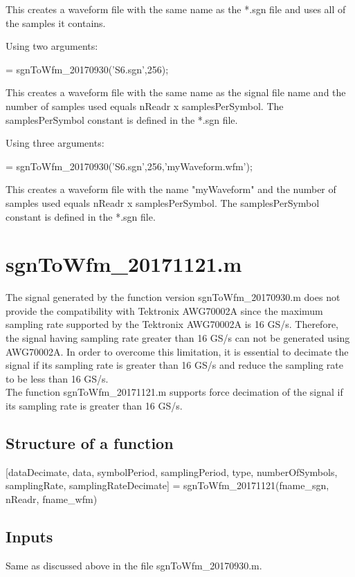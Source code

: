 \noindent
This creates a waveform file with the same name as the *.sgn file and uses all of the samples it contains.
\bigskip

\noindent
Using two arguments:

\bigskip

 = sgnToWfm\_20170930('S6.sgn',256);
\bigskip

\noindent
This creates a waveform file with the same name as the signal file name and the number of samples used equals nReadr x samplesPerSymbol. The samplesPerSymbol constant is 	defined in the *.sgn file.
\bigskip

\noindent
Using three arguments:

\bigskip

 = sgnToWfm\_20170930('S6.sgn',256,'myWaveform.wfm');
\bigskip

\noindent
This creates a waveform file with the name "myWaveform" and the number of samples used equals nReadr x samplesPerSymbol. The samplesPerSymbol constant is defined in the *.sgn file.

\section*{sgnToWfm\_20171121.m}

The signal generated by the function version sgnToWfm\_20170930.m does not provide the compatibility with Tektronix AWG70002A since the maximum sampling rate supported by the Tektronix AWG70002A is 16 GS/s. Therefore, the signal having sampling rate greater than 16 GS/s can not be generated using AWG70002A. In order to overcome this limitation, it is essential to decimate the signal if its sampling rate is greater than 16 GS/s and reduce the sampling rate to be less than 16 GS/s.\\
The function sgnToWfm\_20171121.m supports force decimation of the signal if its sampling rate is greater than 16 GS/s.

\subsection*{Structure of a function}
[dataDecimate, data, symbolPeriod, samplingPeriod, type, numberOfSymbols, samplingRate, samplingRateDecimate]  = sgnToWfm\_20171121(fname\_sgn, nReadr, fname\_wfm)

\subsection*{Inputs}
Same as discussed above in the file sgnToWfm\_20170930.m.


